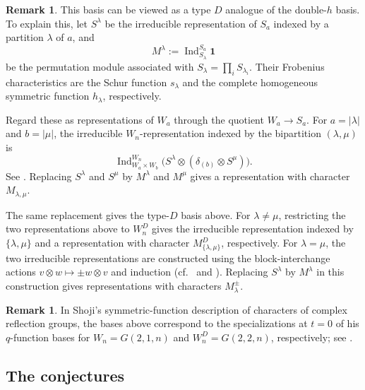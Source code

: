 \documentclass[11pt]{amsart}
\numberwithin{equation}{section}
\theoremstyle{definition}
\newtheorem{remark}[theorem]{Remark}
\DeclareMathOperator{\Ind}{\mathrm{Ind}}
\begin{document}
\begin{remark}
This basis can be viewed as a type $D$ analogue of the double-$h$ basis.
To explain this, let $S^\lambda$ be the irreducible representation of $S_a$ indexed by a partition $\lambda$ of $a$, and %
\[
M^\lambda:=\Ind_{S_\lambda}^{S_a}\mathbf1
\]
be the permutation module associated with $S_\lambda=\prod_i S_{\lambda_i}$.
Their Frobenius characteristics are the Schur function $s_\lambda$ and the complete homogeneous symmetric function $h_\lambda$, respectively.

Regard these as representations of $W_a$ through the quotient $W_a\to S_a$.
For $a=|\lambda|$ and $b=|\mu|$, the irreducible $W_n$-representation indexed by the bipartition $(\lambda,\mu)$ is
\[
\Ind_{W_a\times W_b}^{W_n}
\bigl(S^\lambda\otimes
(\delta_{(b)}\otimes S^\mu)\bigr).
\]
See \cite[Chapter~I, Appendix~B, Section~9]{Macdonald}.
Replacing $S^\lambda$ and $S^\mu$ by $M^\lambda$ and $M^\mu$ gives a representation with character $M_{\lambda,\mu}$.

The same replacement gives the type-$D$ basis above.
For $\lambda\ne\mu$, restricting the two representations above to $W_n^D$ gives the irreducible representation indexed by $\{\lambda,\mu\}$ and a representation with character $M^D_{\{\lambda,\mu\}}$, respectively.
For $\lambda=\mu$, the two irreducible representations are constructed using the block-interchange actions $v\otimes w\mapsto\pm w\otimes v$ and induction (cf.~\cite[Chapter~I, Appendix~B, Section~8]{Macdonald} and \cite[Section~8.2, Proposition~25]{SerreReps}).
Replacing $S^\lambda$ by $M^\lambda$ in this construction gives representations with characters $M_\lambda^\pm$.
\end{remark}

\begin{remark}
In Shoji's symmetric-function description of characters of complex reflection groups, the bases above correspond to the specializations at $t=0$ of his $q$-function bases for $W_n=G(2,1,n)$ and $W_n^D=G(2,2,n)$, respectively; see \cite[Sections~2.15 and~3.1--3.3]{Shoji02}.
\end{remark}



















\subsection{The conjectures}\label{ss:positivity.conjectures}
\end{document}
